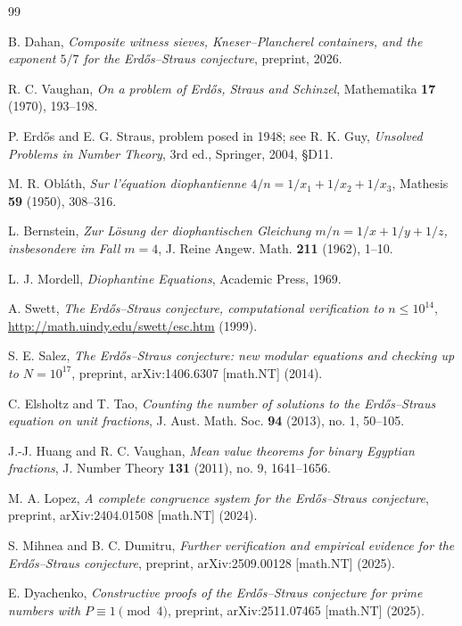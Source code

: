 \documentclass[11pt, a4paper]{article}
\theoremstyle{plain}
\theoremstyle{definition}
\begin{document}
\begin{thebibliography}{99}

 B. Dahan, \textit{Composite witness sieves, Kneser--Plancherel containers, and the exponent $5/7$ for the Erd\H{o}s--Straus conjecture}, preprint, 2026.

 R. C. Vaughan, \textit{On a problem of Erd\H{o}s, Straus and Schinzel}, Mathematika \textbf{17} (1970), 193--198.

 P. Erd\H{o}s and E. G. Straus, problem posed in 1948; see R. K. Guy, \textit{Unsolved Problems in Number Theory}, 3rd ed., Springer, 2004, \S D11.

 M. R. Obl\'{a}th, \textit{Sur l'\'{e}quation diophantienne $4/n=1/x_1+1/x_2+1/x_3$}, Mathesis \textbf{59} (1950), 308--316.

 L. Bernstein, \textit{Zur L\"{o}sung der diophantischen Gleichung $m/n = 1/x + 1/y + 1/z$, insbesondere im Fall $m=4$}, J. Reine Angew. Math. \textbf{211} (1962), 1--10.

 L. J. Mordell, \textit{Diophantine Equations}, Academic Press, 1969.

 A. Swett, \textit{The Erd\H{o}s--Straus conjecture, computational verification to $n\le10^{14}$}, \url{http://math.uindy.edu/swett/esc.htm} (1999).

 S. E. Salez, \textit{The Erd\H{o}s--Straus conjecture: new modular equations and checking up to $N=10^{17}$}, preprint, arXiv:1406.6307 [math.NT] (2014).

 C. Elsholtz and T. Tao, \textit{Counting the number of solutions to the Erd\H{o}s--Straus equation on unit fractions}, J. Aust. Math. Soc. \textbf{94} (2013), no. 1, 50--105.

 J.-J. Huang and R. C. Vaughan, \textit{Mean value theorems for binary Egyptian fractions}, J. Number Theory \textbf{131} (2011), no. 9, 1641--1656.

 M. A. Lopez, \textit{A complete congruence system for the Erd\H{o}s--Straus conjecture}, preprint, arXiv:2404.01508 [math.NT] (2024).

 S. Mihnea and B. C. Dumitru, \textit{Further verification and empirical evidence for the Erd\H{o}s--Straus conjecture}, preprint, arXiv:2509.00128 [math.NT] (2025).

 E. Dyachenko, \textit{Constructive proofs of the Erd\H{o}s--Straus conjecture for prime numbers with $P\equiv1 \pmod 4$}, preprint, arXiv:2511.07465 [math.NT] (2025).


\end{thebibliography}
\end{document}
